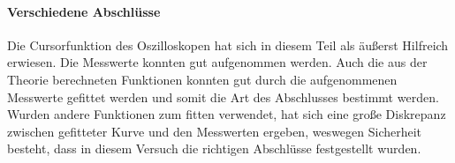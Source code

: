 \paragraph{Verschiedene Abschlüsse}
Die Cursorfunktion des Oszilloskopen hat sich in diesem Teil als 
äußerst Hilfreich erwiesen. Die Messwerte konnten gut aufgenommen 
werden. Auch die aus der Theorie berechneten Funktionen konnten 
gut durch die aufgenommenen Messwerte gefittet werden und 
somit die Art des Abschlusses bestimmt werden.\\
Wurden andere Funktionen zum fitten verwendet, 
hat sich eine große Diskrepanz zwischen gefitteter Kurve und den 
Messwerten ergeben, weswegen Sicherheit besteht, dass in diesem 
Versuch die richtigen Abschlüsse festgestellt wurden.\\